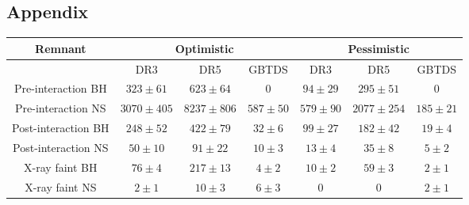 \documentclass{pas}
\begin{document}
\clearpage
\onecolumn
\begin{appendix}

\makeatletter
\renewcommand{\thesection}{\Alph{section}}
\setcounter{section}{1}  %
\renewcommand{\thefigure}{\thesection\arabic{figure}}
\renewcommand{\thetable}{\thesection\arabic{table}}
\setcounter{figure}{0}
\setcounter{table}{0}
\makeatother

\section*{Appendix}

\begin{table}[H]
    \centering 

    \begin{tabular}{c|c|c|c|c|c|c}
        \hline
        \multicolumn{1}{c|}{Remnant} &  \multicolumn{3}{c|}{Optimistic} & \multicolumn{3}{c}{Pessimistic} \\
        \hline
         &  DR3 & DR5 & GBTDS & DR3 & DR5 & GBTDS\\
         \hline
        Pre-interaction BH &  $323\pm61$ & $623\pm64$ & $0$ & $94\pm29$ & $295\pm51$ & $0$\\
        Pre-interaction NS &  $3070\pm405$ & $8237\pm806$ & $587\pm50$ & $579\pm90$ & $2077\pm254$ & $185\pm21$\\
        Post-interaction BH &  $248\pm52$ & $422\pm79$ & $32\pm6$ & $99\pm27$ & $182\pm42$ & $19\pm4$\\
        Post-interaction NS & $50\pm10$ & $91\pm22$ & $10\pm3$ & $13\pm4$ & $35\pm8$ & $5\pm2$\\
        X-ray faint BH &  $76\pm4$ & $217\pm13$ & $4\pm2$ & $10\pm2$ & $59\pm3$ & $2\pm1$\\
        X-ray faint NS &  $2\pm1$ & $10\pm3$ & $6\pm3$ & $0$ & $0$ & $2\pm1$\\
        \hline
        

\end{tabular}
\end{table}
\end{appendix}
\end{document}
